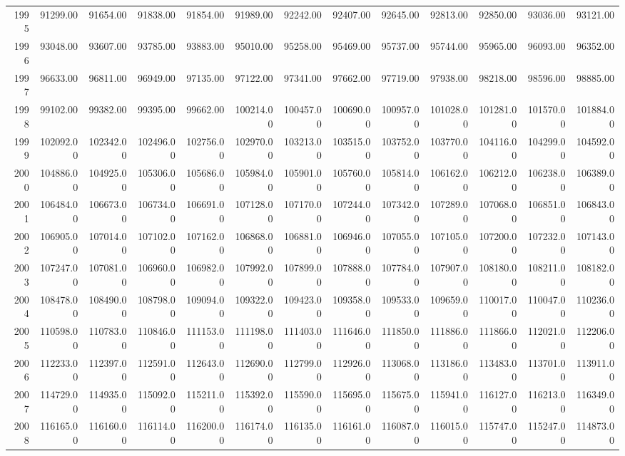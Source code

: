 \begin{longtable}{rrrrrrrrrrrrr}
  1995 & 91299.00 & 91654.00 & 91838.00 & 91854.00 & 91989.00 & 92242.00 & 92407.00 & 92645.00 & 92813.00 & 92850.00 & 93036.00 & 93121.00 \\ 
  1996 & 93048.00 & 93607.00 & 93785.00 & 93883.00 & 95010.00 & 95258.00 & 95469.00 & 95737.00 & 95744.00 & 95965.00 & 96093.00 & 96352.00 \\ 
  1997 & 96633.00 & 96811.00 & 96949.00 & 97135.00 & 97122.00 & 97341.00 & 97662.00 & 97719.00 & 97938.00 & 98218.00 & 98596.00 & 98885.00 \\ 
  1998 & 99102.00 & 99382.00 & 99395.00 & 99662.00 & 100214.00 & 100457.00 & 100690.00 & 100957.00 & 101028.00 & 101281.00 & 101570.00 & 101884.00 \\ 
  1999 & 102092.00 & 102342.00 & 102496.00 & 102756.00 & 102970.00 & 103213.00 & 103515.00 & 103752.00 & 103770.00 & 104116.00 & 104299.00 & 104592.00 \\ 
  2000 & 104886.00 & 104925.00 & 105306.00 & 105686.00 & 105984.00 & 105901.00 & 105760.00 & 105814.00 & 106162.00 & 106212.00 & 106238.00 & 106389.00 \\ 
  2001 & 106484.00 & 106673.00 & 106734.00 & 106691.00 & 107128.00 & 107170.00 & 107244.00 & 107342.00 & 107289.00 & 107068.00 & 106851.00 & 106843.00 \\ 
  2002 & 106905.00 & 107014.00 & 107102.00 & 107162.00 & 106868.00 & 106881.00 & 106946.00 & 107055.00 & 107105.00 & 107200.00 & 107232.00 & 107143.00 \\ 
  2003 & 107247.00 & 107081.00 & 106960.00 & 106982.00 & 107992.00 & 107899.00 & 107888.00 & 107784.00 & 107907.00 & 108180.00 & 108211.00 & 108182.00 \\ 
  2004 & 108478.00 & 108490.00 & 108798.00 & 109094.00 & 109322.00 & 109423.00 & 109358.00 & 109533.00 & 109659.00 & 110017.00 & 110047.00 & 110236.00 \\ 
  2005 & 110598.00 & 110783.00 & 110846.00 & 111153.00 & 111198.00 & 111403.00 & 111646.00 & 111850.00 & 111886.00 & 111866.00 & 112021.00 & 112206.00 \\ 
  2006 & 112233.00 & 112397.00 & 112591.00 & 112643.00 & 112690.00 & 112799.00 & 112926.00 & 113068.00 & 113186.00 & 113483.00 & 113701.00 & 113911.00 \\ 
  2007 & 114729.00 & 114935.00 & 115092.00 & 115211.00 & 115392.00 & 115590.00 & 115695.00 & 115675.00 & 115941.00 & 116127.00 & 116213.00 & 116349.00 \\ 
  2008 & 116165.00 & 116160.00 & 116114.00 & 116200.00 & 116174.00 & 116135.00 & 116161.00 & 116087.00 & 116015.00 & 115747.00 & 115247.00 & 114873.00 \\ 

\end{longtable}
